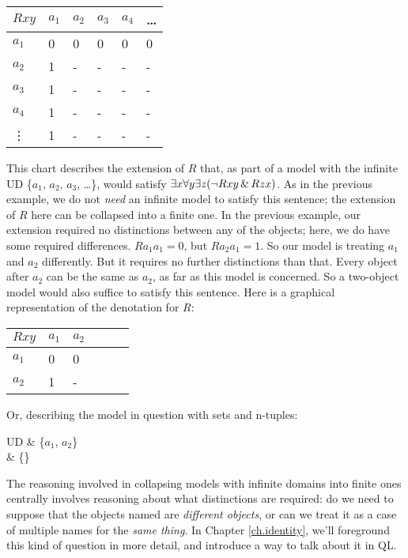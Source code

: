 \begin{table}[h!]
\centering
\begin{tabular}{l|lllll}
$Rxy$   & $a_{1}$ & $a_{2}$ & $a_{3}$ & $a_{4}$ & \ldots \\ \hline
$a_{1}$   & 0 & 0 & 0 & 0 & 0  \\
$a_{2}$   & 1 & - & - & - & -  \\
$a_{3}$  & 1 & - & - & - & -   \\
$a_{4}$   & 1 & - & - & - & -   \\
\vdots & 1 & - & - & - & -
\end{tabular}
\end{table}

This chart describes the extension of $R$ that, as part of a model with the infinite UD \{$a_{1}$, $a_{2}$, $a_{3}$, \ldots\}, would satisfy $\exists x \forall y \exists z (\neg Rxy \,\&\, Rzx)$. As in the previous example, we do not \emph{need} an infinite model to satisfy this sentence; the extension of $R$ here can be collapsed into a finite one. In the previous example, our extension required no distinctions between any of the objects; here, we do have some required differences. $Ra_{1}a_{1}=0$, but $Ra_{2}a_{1}=1$. So our model is treating $a_{1}$ and $a_{2}$ differently. But it requires no further distinctions than that. Every object after $a_{2}$ can be the same as $a_{2}$, as far as this model is concerned.  So a two-object model would also suffice to satisfy this sentence. Here is a graphical representation of the denotation for $R$:

\begin{table}[h!]
\centering
\begin{tabular}{l|lllll}
$Rxy$   & $a_{1}$ & $a_{2}$ \\ \hline
$a_{1}$   & 0 & 0   \\
$a_{2}$   & 1 & - \\
\end{tabular}
\end{table}

Or, describing the model in question with sets and n-tuples:


\begin{partialmodel}
	UD & \{$a_{1}$, $a_{2}$\}\\
	 & \{\}
\end{partialmodel}


The reasoning involved in collapsing models with infinite domains into finite ones centrally involves reasoning about what distinctions are required: do we need to suppose that the objects named are \emph{different objects}, or can we treat it as a case of multiple names for the \emph{same thing}. In Chapter \ref{ch.identity}, we'll foreground this kind of question in more detail, and introduce a way to talk about it in QL.

